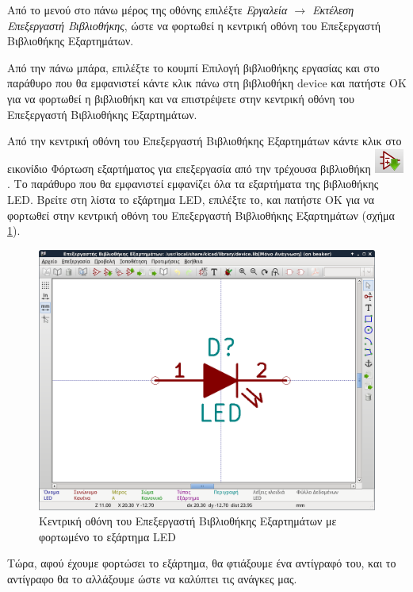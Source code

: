 \documentclass[a4paper]{article}
\begin{document}
Από το μενού στο πάνω μέρος της οθόνης επιλέξτε \textit{Εργαλεία $\rightarrow$ Εκτέλεση Επεξεργαστή Βιβλιοθήκης}, ώστε να φορτωθεί η κεντρική οθόνη του Επεξεργαστή Βιβλιοθήκης Εξαρτημάτων.

Από την πάνω μπάρα, επιλέξτε το κουμπί Επιλογή βιβλιοθήκης εργασίας και στο παράθυρο που θα εμφανιστεί κάντε κλικ πάνω στη βιβλιοθήκη device και πατήστε ΟΚ για να φορτωθεί η βιβλιοθήκη και να επιστρέψετε στην κεντρική οθόνη του Επεξεργαστή Βιβλιοθήκης Εξαρτημάτων.

Από την κεντρική οθόνη του Επεξεργαστή Βιβλιοθήκης Εξαρτημάτων κάντε κλικ στο εικονίδιο Φόρτωση εξαρτήματος για επεξεργασία από την τρέχουσα βιβλιοθήκη \includegraphics[scale=.5]{img/libed-ico-loadcomp.png}
. Το παράθυρο που θα εμφανιστεί εμφανίζει όλα τα εξαρτήματα της βιβλιοθήκης LED. Βρείτε στη λίστα το εξάρτημα LED, επιλέξτε το, και πατήστε ΟΚ για να φορτωθεί στην κεντρική οθόνη του Επεξεργαστή Βιβλιοθήκης Εξαρτημάτων (σχήμα \ref{fig:libed-wind-led}).

\begin{figure}
  \begin{center}
    \includegraphics[width=.9\textwidth]{img/libed-wind-led.png}
    \caption{Κεντρική οθόνη του Επεξεργαστή Βιβλιοθήκης Εξαρτημάτων με φορτωμένο το εξάρτημα LED}
    \label{fig:libed-wind-led}
  \end{center}
\end{figure}

Τώρα, αφού έχουμε φορτώσει το εξάρτημα, θα φτιάξουμε ένα αντίγραφό του, και το αντίγραφο θα το αλλάξουμε ώστε να καλύπτει τις ανάγκες μας.
\end{document}
